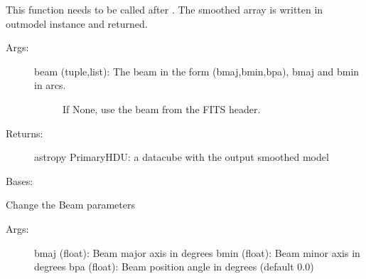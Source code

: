 \documentclass[letterpaper,10pt,english]{sphinxmanual}
\begin{document}
\begin{fulllineitems}
\begin{fulllineitems}
This function needs to be called after {\hyperref[\detokenize{pybb_api:pyBBarolo.pyBBarolo.FitMod3D.compute}]{}}. The smoothed array is written
in outmodel instance and returned.
\begin{description}
\item[{Args:}] \leavevmode\begin{description}
\item[{beam (tuple,list): The beam in the form (bmaj,bmin,bpa), bmaj and bmin in arcs.}] \leavevmode
If None, use the beam from the FITS header.

\end{description}

\item[{Returns:}] \leavevmode
astropy PrimaryHDU: a datacube with the output smoothed model

\end{description}

\end{fulllineitems}


\end{fulllineitems}


\begin{fulllineitems}
\label{\detokenize{pybb_api:pyBBarolo.pyBBarolo.FitsCube}}
Bases: 

\begin{fulllineitems}
\label{\detokenize{pybb_api:pyBBarolo.pyBBarolo.FitsCube.setBeam}}
Change the Beam parameters
\begin{description}
\item[{Args:}] \leavevmode
bmaj (float): Beam major axis in degrees
bmin (float): Beam minor axis in degrees
bpa  (float): Beam position angle in degrees (default 0.0)

\end{description}

\end{fulllineitems}


\end{fulllineitems}
\end{document}
